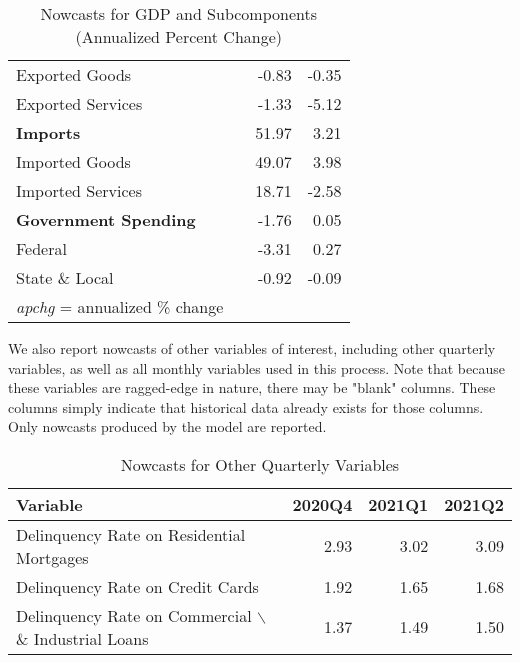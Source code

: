 \documentclass[11pt, letterpaper]{article}\usepackage[]{graphicx}\usepackage[]{color}
\begin{document}
\begin{table}[H]
\begin{tabular}{lrrr}
  \hspace{8mm}  Exported Goods &  & -0.83 & -0.35 \\ 
  \hspace{8mm}  Exported Services &  & -1.33 & -5.12 \\ 
  \hspace{0mm} \textbf{Imports} &  & 51.97 & 3.21 \\ 
  \hspace{8mm}  Imported Goods &  & 49.07 & 3.98 \\ 
  \hspace{8mm}  Imported Services &  & 18.71 & -2.58 \\ 
  \hspace{0mm} \textbf{Government Spending} &  & -1.76 & 0.05 \\ 
  \hspace{8mm}  Federal &  & -3.31 & 0.27 \\ 
  \hspace{8mm}  State \& Local &  & -0.92 & -0.09 \\ 
   \hline 
 \textit{apchg} = annualized \% change 
\end{tabular}
\endgroup
\caption{Nowcasts for GDP and Subcomponents (Annualized Percent Change)} 
\end{table}


We also report nowcasts of other variables of interest, including other quarterly variables, as well as all monthly variables used in this process. Note that because these variables are ragged-edge in nature, there may be "blank" columns. These columns simply indicate that historical data already exists for those columns. Only nowcasts produced by the model are reported.
\begin{table}[H]
\centering
\begingroup\fontsize{11pt}{13pt}\selectfont
\begin{tabular}{lrrr}
  \hline
Variable & 2020Q4 & 2021Q1 & 2021Q2 \\ 
  \hline
Delinquency Rate on Residential Mortgages & 2.93 & 3.02 & 3.09 \\ 
  Delinquency Rate on Credit Cards & 1.92 & 1.65 & 1.68 \\ 
  Delinquency Rate on Commercial $\backslash$\& Industrial Loans & 1.37 & 1.49 & 1.50 \\ 
   \hline
\end{tabular}
\endgroup
\caption{Nowcasts for Other Quarterly Variables} 
\end{table}
\end{document}
